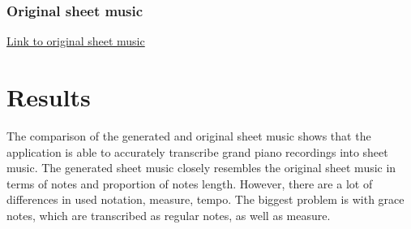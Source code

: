 \documentclass{article}
\begin{document}
\subsubsection{Original sheet music}
\hyperref[fig:original_pathetique]{Link to original sheet music}


\clearpage
\begin{figure}[htbp]
    \centering
    \label{fig:generated_chopin}
    
\end{figure}

\clearpage
\begin{figure}[htbp]
    \centering
    \label{fig:original_chopin}
    
\end{figure}

\clearpage
\begin{figure}[htbp]
    \centering
    \label{fig:generated_waldstein}
    
\end{figure}

\clearpage
\begin{figure}[htbp]
    \centering
    \label{fig:original_waldstein}
    
\end{figure}

\clearpage
\begin{figure}[htbp]
    \centering
    \label{fig:generated_pathetique}
    
\end{figure}

\clearpage
\begin{figure}[htbp]
    \centering
    \label{fig:original_pathetique}
    
\end{figure}




\FloatBarrier
\clearpage
\section{Results}

The comparison of the generated and original sheet music shows that the application is able to accurately transcribe grand piano recordings into sheet music. The generated sheet music closely resembles the original sheet music in terms of notes and proportion of notes length. However, there are a lot of differences in used notation, measure, tempo. The biggest problem is with grace notes, which are transcribed as regular notes, as well as measure. 
\end{document}
